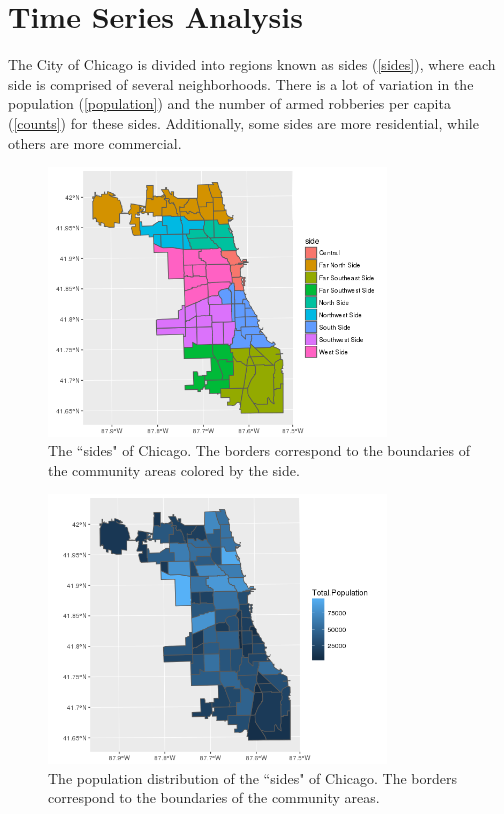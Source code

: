 \documentclass{article} %
\begin{document}
\section{Time Series Analysis}


\noindent The City of Chicago is divided into regions known as sides (\autoref{sides}), where each side is comprised of several neighborhoods. There is a lot of variation in the population (\autoref{population}) and the number of armed robberies per capita (\autoref{counts}) for these sides.  Additionally, some sides are more residential, while others are more commercial.\newline
 
\begin{figure}[h]
\begin{center}

\includegraphics[width=0.8\textwidth,keepaspectratio]{CopyOfside.png}
\caption{The ``sides" of Chicago.  The borders correspond to  the boundaries of the community areas colored by the side.}
\label{sides}
\end{center}
\end{figure}


\begin{figure}[h]
\begin{center}

\includegraphics[width=0.8\textwidth,keepaspectratio]{Plots/population.png}
\caption{The population distribution of the  ``sides" of Chicago.  The borders correspond to  the boundaries of the community areas.}
\label{population}
\end{center}
\end{figure}
\end{document}
